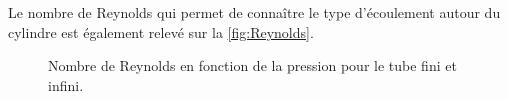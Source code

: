 \documentclass[a4paper, 12pt,oneside]{article}
\begin{document}
\noindent Le nombre de Reynolds qui permet de connaître le type d'écoulement autour du cylindre est également relevé sur la \autoref{fig:Reynolds}. 
\begin{figure}
    \centering
    \caption{Nombre de Reynolds en fonction de la pression pour le tube fini et infini.}
    \label{fig:Reynolds}
\end{figure}



\end{document}
